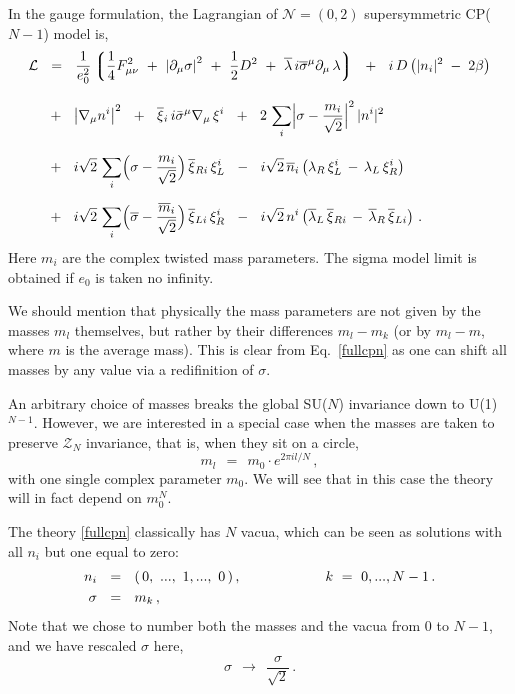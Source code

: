 \documentclass[epsfig,12pt]{article}
\def\beq{\begin{equation}}
\def\eeq{\end{equation}}
\newcommand{\cell}{{\mathcal L}}
\newcommand{\pt}{\partial}
\def\beq{\begin{equation}}
\def\eeq{\end{equation}}
\newcommand{\ntwoo}{${\mathcal N}= \left(0,2\right) $ }
\newcommand{\ov}{\overline}
\newcommand{\mc}[1]{\mathcal{#1}}
\newcommand{\lgr}{\left\lgroup}
\newcommand{\rgr}{\right\rgroup}
\newcommand{\bla}{\ov{\lambda}}
\begin{document}
In the gauge formulation, the Lagrangian of \ntwoo supersymmetric CP($N-1$) model is,
\begin{align}
%
\cell & ~~=~~ 
	\frac{1}{e_0^2} \lgr \frac{1}{4} F_{\mu\nu}^2 ~+~ \left|\pt_\mu\sigma\right|^2 ~+~ \frac{1}{2}D^2
			~+~ \bla \, i\ov{\sigma}{}^\mu\pt_\mu\,\lambda \rgr
	~~+~~ i\,D\left( |n_i|^2 \;-\; 2\beta \right)
	\nonumber
	\\[3mm]
%
& 	~~+~~
	\left|\nabla_\mu n^i\right|^2 
	~~+~~ \ov{\xi}{}_i\, i\bar{\sigma}{}^\mu\nabla_\mu\,\xi^i  
	~~+~~ 2\,\sum_i \Bigl| \sigma-\frac{m_i}{\sqrt 2} \Bigr|^2\, |n^i|^2
	\nonumber
	\\[3mm]
%
&	~~+~~
	i\sqrt{2}\,\sum_i \Bigl( \sigma -\frac{m_i}{\sqrt 2}\Bigr)\, \ov{\xi}{}_{Ri}\, \xi^i_L 
	~~-~~ 
	i\sqrt{2}\,\ov{n}{}_i \left(\lambda_R\,\xi^i_L \,-\, \lambda_L\,\xi^i_R \right)
\label{fullcpn}
	\\[2mm]
%
&	~~+~~
	i\sqrt{2}\,\sum_i \Bigl( \ov{\sigma} - \frac{\ov{m}{}_i}{\sqrt 2}\Bigr)\, \ov{\xi}{}_{Li}\, \xi^i_R 
	~~-~~ 
	i\sqrt{2}\,{n}^i \left(\ov{\lambda}{}_L\,\ov{\xi}{}_{Ri} \,-\, \ov{\lambda}{}_R\,\ov{\xi}{}_{Li} \right) \,.
	\notag
\end{align}
	Here $ m_i $ are the complex twisted mass parameters. 
	The sigma model limit is obtained if $ e_0 $ is taken no infinity.

	We should mention that physically the mass parameters are not given by the masses $ m_l $ themselves,
	but rather by their differences $ m_l - m_k $ (or by $ m_l - m $, where $ m $ is the average mass).
	This is clear from Eq.~\eqref{fullcpn} as one can shift all masses by any value via a redifinition of
	$ \sigma $.

	An arbitrary choice of masses breaks the global SU($N$) invariance down to U(1)$^{N-1}$.
	However, we are interested in a special case when the masses are taken to preserve $ \mc{Z}_N $ invariance, 
	that is, when they sit on a circle,
\beq
\label{mcirc}
	m_l ~~=~~ m_0 \cdot e^{2 \pi i l / N}\,,
\eeq
	with one single complex parameter $ m_0 $.
	We will see that in this case the theory will in fact depend on $ m_0^N $.


	The theory \eqref{fullcpn} classically has $ N $ vacua, which can be seen as solutions with all $ n_i $ but one 
	equal to zero:
\begin{align}
%
	n_i & ~~=~~ (\, 0,~ ...,~ 1, ...,~ 0\, )\,,  	\qquad\qquad\qquad  k ~=~ 0,..., N-1\,.
\notag
	\\
%
	\sigma & ~~=~~ m_k \,,
\label{nvacua}
\end{align}
	Note that we chose to number both the masses and the vacua from $0$ to $N-1$, and 
	we have rescaled $ \sigma $ here,
\beq
	\sigma ~~\to~~ \frac{\sigma}{\sqrt 2}\,.
\eeq
\end{document}
